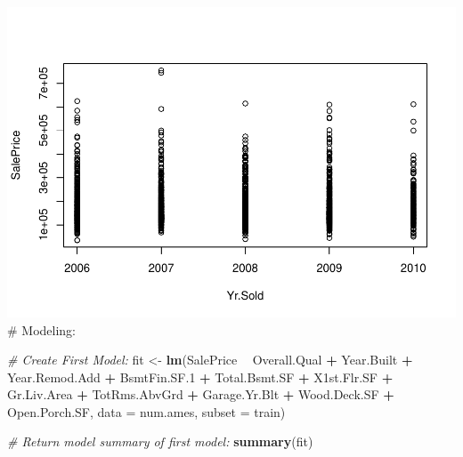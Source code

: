 \documentclass[
]{article}
\newenvironment{Shaded}{\begin{snugshade}}{\end{snugshade}}
\newcommand{\CommentTok}[1]{\textcolor[rgb]{0.56,0.35,0.01}{\textit{#1}}}
\newcommand{\DataTypeTok}[1]{\textcolor[rgb]{0.13,0.29,0.53}{#1}}
\newcommand{\FloatTok}[1]{\textcolor[rgb]{0.00,0.00,0.81}{#1}}
\newcommand{\KeywordTok}[1]{\textcolor[rgb]{0.13,0.29,0.53}{\textbf{#1}}}
\newcommand{\NormalTok}[1]{#1}
\newcommand{\OperatorTok}[1]{\textcolor[rgb]{0.81,0.36,0.00}{\textbf{#1}}}
\newcommand{\StringTok}[1]{\textcolor[rgb]{0.31,0.60,0.02}{#1}}
\begin{document}
\includegraphics{Predicting-Housing-Price_files/figure-latex/unnamed-chunk-2-34.pdf}
\# Modeling:

\begin{Shaded}
\begin{Highlighting}[]
\CommentTok{# Create First Model:}
\NormalTok{fit <-}\StringTok{ }\KeywordTok{lm}\NormalTok{(SalePrice }\OperatorTok{~}\StringTok{ }\NormalTok{Overall.Qual }\OperatorTok{+}\StringTok{ }\NormalTok{Year.Built }\OperatorTok{+}\StringTok{ }\NormalTok{Year.Remod.Add }\OperatorTok{+}\StringTok{ }\NormalTok{BsmtFin.SF}\FloatTok{.1} \OperatorTok{+}\StringTok{ }\NormalTok{Total.Bsmt.SF }\OperatorTok{+}\StringTok{ }\NormalTok{X1st.Flr.SF }\OperatorTok{+}\StringTok{ }\NormalTok{Gr.Liv.Area }\OperatorTok{+}\StringTok{ }\NormalTok{TotRms.AbvGrd }\OperatorTok{+}
\StringTok{            }\NormalTok{Garage.Yr.Blt }\OperatorTok{+}\StringTok{ }\NormalTok{Wood.Deck.SF }\OperatorTok{+}\StringTok{  }\NormalTok{Open.Porch.SF, }\DataTypeTok{data =}\NormalTok{ num.ames, }\DataTypeTok{subset =}\NormalTok{ train)}

\CommentTok{# Return model summary of first model:}
\KeywordTok{summary}\NormalTok{(fit)}
\end{Highlighting}
\end{Shaded}
\end{document}
